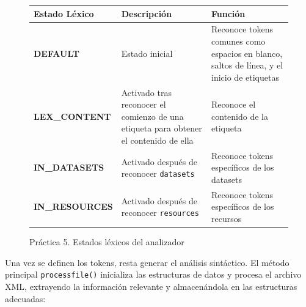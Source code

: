 \begin{figure}[H]
  \centering
  \begin{tabularx}{\textwidth}{>{\bfseries}l X X}
  \toprule
  \textbf{Estado Léxico} & \textbf{Descripción} & \textbf{Función} \\
  \midrule
  DEFAULT & Estado inicial & Reconoce tokens comunes como espacios en blanco, saltos de línea, y el inicio de etiquetas \\
  \midrule
  LEX\_CONTENT & Activado tras reconocer el comienzo de una etiqueta para obtener el contenido de ella & Reconoce el contenido de la etiqueta \\
  \midrule
  IN\_DATASETS & Activado después de reconocer \lstinline|datasets| & Reconoce tokens específicos de los datasets \\
  \midrule
  IN\_RESOURCES & Activado después de reconocer \lstinline|resources| & Reconoce tokens específicos de los recursos \\
  \bottomrule
  \end{tabularx}
  \caption{\label{fig:estadoslexicosp5}Práctica 5. Estados léxicos del analizador}
  \label{table:lexical_statesp5}
  \end{figure}


Una vez se definen los tokens, resta generar el análisis sintáctico. El método principal \lstinline|processfile()| inicializa las estructuras de datos y procesa el archivo XML, extrayendo la información relevante y almacenándola en las estructuras adecuadas:

